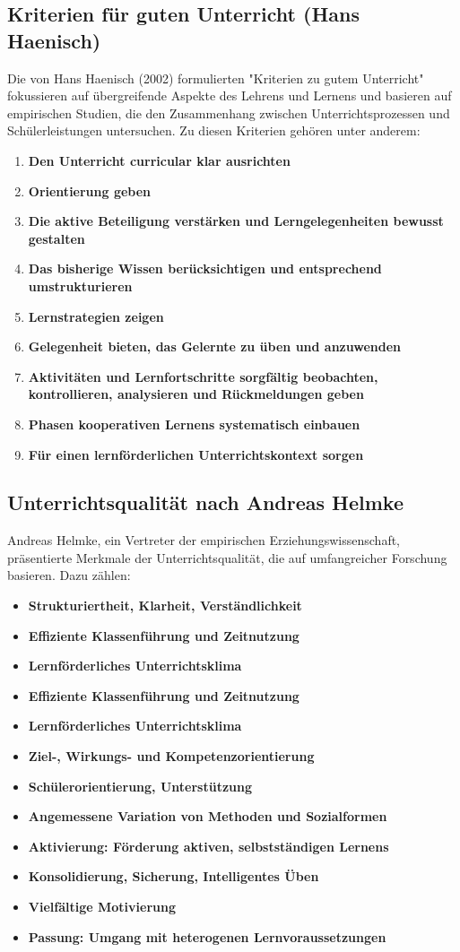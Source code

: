 \subsection{Kriterien für guten Unterricht (Hans Haenisch)}
Die von Hans Haenisch (2002) formulierten "Kriterien zu gutem Unterricht" fokussieren auf übergreifende Aspekte des Lehrens und Lernens und basieren auf empirischen Studien, die den Zusammenhang zwischen Unterrichtsprozessen und Schülerleistungen untersuchen. Zu diesen Kriterien gehören unter anderem:
\begin{enumerate}
    \item \textbf{Den Unterricht curricular klar ausrichten}
    \item \textbf{Orientierung geben}
    \item \textbf{Die aktive Beteiligung verstärken und Lerngelegenheiten bewusst gestalten}
    \item \textbf{Das bisherige Wissen berücksichtigen und entsprechend umstrukturieren}
    \item \textbf{Lernstrategien zeigen}
    \item \textbf{Gelegenheit bieten, das Gelernte zu üben und anzuwenden}
    \item \textbf{Aktivitäten und Lernfortschritte sorgfältig beobachten, kontrollieren, analysieren und Rückmeldungen geben}
    \item \textbf{Phasen kooperativen Lernens systematisch einbauen}
    \item \textbf{Für einen lernförderlichen Unterrichtskontext sorgen}
\end{enumerate}
\subsection{Unterrichtsqualität nach Andreas Helmke}
Andreas Helmke, ein Vertreter der empirischen Erziehungswissenschaft, präsentierte Merkmale der Unterrichtsqualität, die auf umfangreicher Forschung basieren. Dazu zählen:
\begin{itemize}
    \item \textbf{Strukturiertheit, Klarheit, Verständlichkeit}
    \item \textbf{Effiziente Klassenführung und Zeitnutzung}
    \item \textbf{Lernförderliches Unterrichtsklima}
    \item \textbf{Effiziente Klassenführung und Zeitnutzung}
    \item \textbf{Lernförderliches Unterrichtsklima}
    \item \textbf{Ziel-, Wirkungs- und Kompetenzorientierung}
    \item \textbf{Schülerorientierung, Unterstützung}
    \item \textbf{Angemessene Variation von Methoden und Sozialformen}
    \item \textbf{Aktivierung: Förderung aktiven, selbstständigen Lernens}
    \item \textbf{Konsolidierung, Sicherung, Intelligentes Üben}
    \item \textbf{Vielfältige Motivierung}
    \item \textbf{Passung: Umgang mit heterogenen Lernvoraussetzungen}
\end{itemize}
